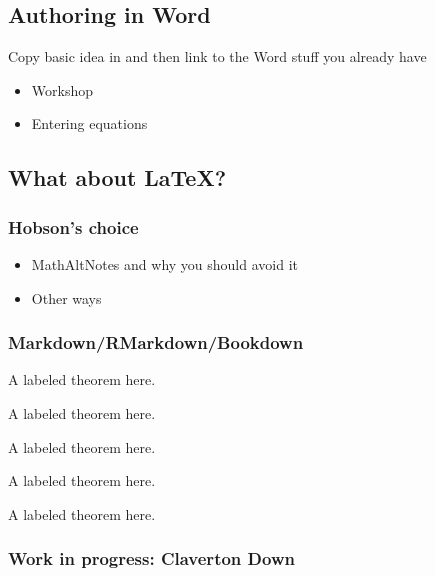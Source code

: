 \documentclass[
  12pt,
  english,
  a4paper]{extarticle}
\providecommand{\tightlist}{%
  \setlength{\itemsep}{0pt}\setlength{\parskip}{0pt}}
\theoremstyle{plain}
\theoremstyle{plain}
\theoremstyle{plain}
\theoremstyle{plain}
\theoremstyle{plain}
\theoremstyle{definition}
\theoremstyle{definition}
\theoremstyle{definition}
\theoremstyle{remark}
\let\BeginKnitrBlock\begin \let\EndKnitrBlock\end
\renewcommand{\;}{\,}
\begin{document}
\hypertarget{authoring-in-word}{%
\subsection{Authoring in Word}\label{authoring-in-word}}

Copy basic idea in and then link to the Word stuff you already have

\begin{itemize}
\tightlist
\item
  Workshop
\item
  Entering equations
\end{itemize}

\hypertarget{what-about-latex}{%
\subsection{What about LaTeX?}\label{what-about-latex}}

\hypertarget{hobsons-choice}{%
\subsubsection{Hobson's choice}\label{hobsons-choice}}

\begin{itemize}
\tightlist
\item
  MathAltNotes and why you should avoid it
\item
  Other ways
\end{itemize}

\hypertarget{markdownrmarkdownbookdown}{%
\subsubsection{Markdown/RMarkdown/Bookdown}\label{markdownrmarkdownbookdown}}

\BeginKnitrBlock{theorem}
\label{thm:thm1} A labeled theorem here.
\EndKnitrBlock{theorem}

\BeginKnitrBlock{proposition}
\label{prp:prop1} A labeled theorem here.
\EndKnitrBlock{proposition}

\BeginKnitrBlock{lemma}
\label{lem:lem1} A labeled theorem here.
\EndKnitrBlock{lemma}

\BeginKnitrBlock{theorem}
\label{thm:thm2} A labeled theorem here.
\EndKnitrBlock{theorem}

\BeginKnitrBlock{corollary}
\label{cor:cor1} A labeled theorem here.
\EndKnitrBlock{corollary}

\hypertarget{work-in-progress-claverton-down}{%
\subsubsection{Work in progress: Claverton Down}\label{work-in-progress-claverton-down}}
\end{document}
